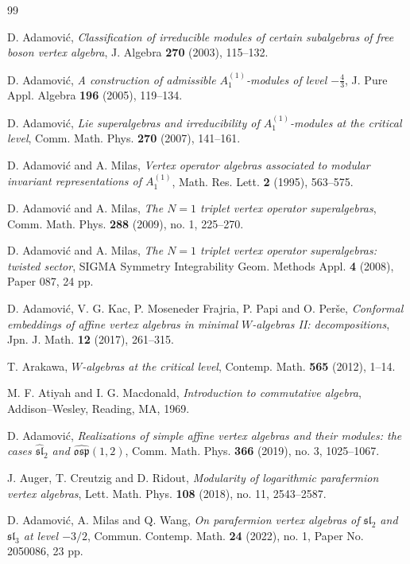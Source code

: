 \documentclass[11 pt]{amsart}
\theoremstyle{definition}
\theoremstyle{plain}
\begin{document}
\begin{thebibliography}{99}
\small

D. Adamovi\'c,
\emph{Classification of irreducible modules of certain subalgebras of free boson vertex algebra},
J. Algebra \textbf{270} (2003), 115--132.

D. Adamovi\'c,
\emph{A construction of admissible $A_1^{(1)}$-modules of level $-\frac{4}{3}$},
J. Pure Appl. Algebra \textbf{196} (2005), 119--134.

D. Adamovi\'c,
\emph{Lie superalgebras and irreducibility of
$A_1^{(1)}$-modules at the critical level},
Comm. Math. Phys. \textbf{270} (2007), 141--161.

D. Adamovi\'c and A. Milas,
\emph{Vertex operator algebras associated to modular invariant
representations of $A^{(1)}_1$},
Math. Res. Lett. \textbf{2} (1995), 563--575.


D. Adamovi\'c and A. Milas,
\emph{The $N=1$ triplet vertex operator superalgebras},
Comm. Math. Phys. \textbf{288} (2009), no. 1, 225--270.

D. Adamovi\'c and A. Milas,
\emph{The $N=1$ triplet vertex operator superalgebras: twisted sector},
SIGMA Symmetry Integrability Geom. Methods Appl. \textbf{4} (2008), Paper 087, 24 pp.


D. Adamovi\'c, V. G. Kac, P. Moseneder Frajria, P. Papi and O. Per\v se,
\emph{Conformal embeddings of affine vertex algebras in minimal
$W$-algebras II: decompositions},
Jpn. J. Math. \textbf{12} (2017), 261--315.

T. Arakawa,
\emph{$W$-algebras at the critical level},
Contemp. Math. \textbf{565} (2012), 1--14.

M. F. Atiyah and I. G. Macdonald,
\emph{Introduction to commutative algebra},
Addison--Wesley, Reading, MA, 1969.

D. Adamovi\'c,
\emph{Realizations of simple affine vertex algebras and their modules: the cases
$\widehat{\mathfrak{sl}}_2$ and $\widehat{\mathfrak{osp}}(1,2)$},
Comm. Math. Phys. \textbf{366} (2019), no. 3, 1025--1067.


J. Auger, T. Creutzig and D. Ridout,
\emph{Modularity of logarithmic parafermion vertex algebras},
Lett. Math. Phys. \textbf{108} (2018), no. 11, 2543--2587.

D. Adamovi\'c, A. Milas and Q. Wang,
\emph{On parafermion vertex algebras of $\mathfrak{sl}_2$ and $\mathfrak{sl}_3$ at level $-3/2$},
Commun. Contemp. Math. \textbf{24} (2022), no. 1, Paper No. 2050086, 23 pp.



\end{thebibliography}
\end{document}
